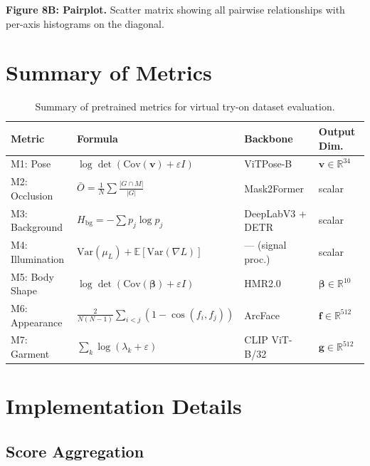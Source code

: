 \documentclass[runningheads]{llncs}
\newcommand{\R}{\mathbb{R}}
\newcommand{\E}{\mathbb{E}}
\newcommand{\Var}{\mathrm{Var}}
\newcommand{\Cov}{\mathrm{Cov}}
\newcommand{\bvec}[1]{\bm{#1}}
\newcommand{\logdet}{\log\det}
\begin{document}
\textbf{Figure 8B: Pairplot.} Scatter matrix showing all pairwise relationships with per-axis histograms on the diagonal.


\section{Summary of Metrics}
\label{sec:summary}

\begin{table}[h!]
\centering
\caption{Summary of pretrained metrics for virtual try-on dataset evaluation.}
\label{tab:metrics_summary}
\small
\begin{tabular}{@{}llll@{}}
\toprule
\textbf{Metric} & \textbf{Formula} & \textbf{Backbone} & \textbf{Output Dim.} \\
\midrule
M1: Pose & $\logdet(\Cov(\bvec{v}) + \varepsilon I)$ & ViTPose-B & $\bvec{v} \in \R^{34}$ \\
M2: Occlusion & $\bar{O} = \frac{1}{N}\sum \frac{|G \cap M|}{|G|}$ & Mask2Former & scalar \\
M3: Background & $H_{\text{bg}} = -\sum p_j \log p_j$ & DeepLabV3 + DETR & scalar \\
M4: Illumination & $\Var(\mu_L) + \E[\Var(\nabla L)]$ & --- (signal proc.) & scalar \\
M5: Body Shape & $\logdet(\Cov(\bvec{\beta}) + \varepsilon I)$ & HMR2.0 & $\bvec{\beta} \in \R^{10}$ \\
M6: Appearance & $\frac{2}{N(N-1)}\sum_{i<j}(1 - \cos(f_i, f_j))$ & ArcFace & $\bvec{f} \in \R^{512}$ \\
M7: Garment & $\sum_k \log(\lambda_k + \varepsilon)$ & CLIP ViT-B/32 & $\bvec{g} \in \R^{512}$ \\
\bottomrule
\end{tabular}
\end{table}


\section{Implementation Details}
\label{sec:implementation}

\subsection{Score Aggregation}
\end{document}
